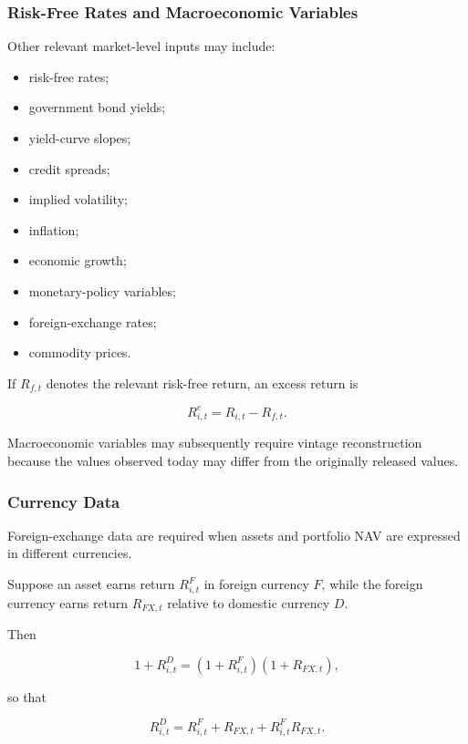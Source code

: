 \documentclass[11pt,a4paper]{article}
\begin{document}
\subsubsection{Risk-Free Rates and Macroeconomic Variables}

Other relevant market-level inputs may include:

\begin{itemize}
    \item risk-free rates;
    \item government bond yields;
    \item yield-curve slopes;
    \item credit spreads;
    \item implied volatility;
    \item inflation;
    \item economic growth;
    \item monetary-policy variables;
    \item foreign-exchange rates;
    \item commodity prices.
\end{itemize}

If $R_{f,t}$ denotes the relevant risk-free return, an excess return is

\begin{equation}
\boxed{
R_{i,t}^{e}
=
R_{i,t}-R_{f,t}.
}
\end{equation}

Macroeconomic variables may subsequently require vintage reconstruction because
the values observed today may differ from the originally released values.


\subsubsection{Currency Data}

Foreign-exchange data are required when assets and portfolio NAV are expressed
in different currencies.

Suppose an asset earns return $R_{i,t}^{F}$ in foreign currency $F$, while the
foreign currency earns return $R_{FX,t}$ relative to domestic currency $D$.

Then

\begin{equation}
1+R_{i,t}^{D}
=
\left(
1+R_{i,t}^{F}
\right)
\left(
1+R_{FX,t}
\right),
\end{equation}

so that

\begin{equation}
\boxed{
R_{i,t}^{D}
=
R_{i,t}^{F}
+
R_{FX,t}
+
R_{i,t}^{F}R_{FX,t}.
}
\end{equation}
\end{document}
